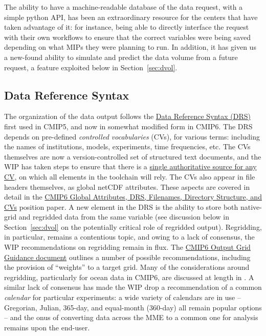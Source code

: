 \documentclass[gmd,manuscript]{copernicus}
\newcommand{\bibref}[1] { \cite{ref:#1}}
\newcommand{\secref}[1] {\mbox{Section  \ref{sec:#1}}}
\begin{document}
The ability to have a machine-readable database of the data request,
with a simple python API, has been an extraordinary resource for the
centers that have taken advantage of it: for instance, being able to
directly interface the request with their own workflows to ensure that
the correct variables were being saved depending on what MIPs they
were planning to run. In addition, it has given us a new-found ability
to simulate and predict the data volume from a future request, a
feature exploited below in \secref{dvol}.

\subsection{Data Reference Syntax}
\label{sec:data-drs}

The organization of the data output follows the
\href{http://goo.gl/v1drZl}{Data Reference Syntax (DRS)} first used in
CMIP5, and now in somewhat modified form in CMIP6. The DRS depends on
pre-defined \emph{controlled vocabularies} (CVs), for various terms:
including the names of institutions, models, experiments, time
frequencies, etc. The CVs themselves are now a version-controlled set
of structured text documents, and the WIP has taken steps to ensure
that there is a \href{https://goo.gl/HGafnJ}{single authoritative
  source for any CV}, on which all elements in the toolchain will
rely. The CVs also appear in file headers themselves, as global netCDF
attributes. These aspects are covered in detail in the
\href{https://goo.gl/mSe4rf}{CMIP6 Global Attributes, DRS, Filenames,
  Directory Structure, and CVs} position paper. A new element in the
DRS is the ability to store both native-grid and regridded data from
the same variable (see discussion below in \secref{dvol} on the
potentially critical role of regridded output). Regridding, in
particular, remains a contentious topic, and owing to a lack of
consensus, the WIP recommendations on regridding remain in flux. The
\href{https://goo.gl/wVtm5t}{CMIP6 Output Grid Guidance document}
outlines a number of possible recommendations, including the provision
of ``weights'' to a target grid. Many of the considerations around
regridding, particularly for ocean data in CMIP6, are discussed at
length in \bibref{griffiesetal2016}. A similar lack of consensus has
made the WIP drop a recommendation of a common \emph{calendar} for
particular experiments: a wide variety of calendars are in use --
Gregorian, Julian, 365-day, and equal-month (360-day) all remain
popular options -- and the onus of converting data across the MME to a
common one for analysis remains upon the end-user.
\end{document}
